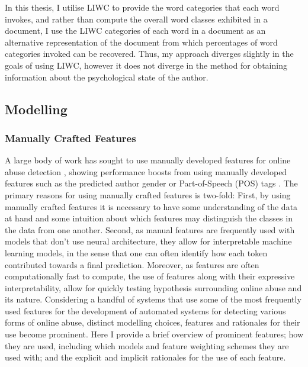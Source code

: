 In this thesis, I utilise LIWC to provide the word categories that each word invokes, and rather than compute the overall word classes exhibited in a document, I use the LIWC categories of each word in a document as an alternative representation of the document from which percentages of word categories invoked can be recovered. Thus, my approach diverges slightly in the goals of using LIWC, however it does not diverge in the method for obtaining information about the psychological state of the author.

\subsection{Modelling}
\subsubsection{Manually Crafted Features}

A large body of work has sought to use manually developed features for online abuse detection \citep{Davidson:2017,Waseem:2017,Ibrohim:2019,Vega:2019,Wiegand:2018,Tian:2020,Kumar:2019,Fortuna:2018}, showing performance boosts from using manually developed features such as the predicted author gender \citep{Waseem-Hovy:2016} or Part-of-Speech (POS) tags \citep{Davidson:2017}. The primary reasons for using manually crafted features is two-fold: First, by using manually crafted features it is necessary to have some understanding of the data at hand and some intuition about which features may distinguish the classes in the data from one another. Second, as manual features are frequently used with models that don't use neural architecture, they allow for interpretable machine learning models, in the sense that one can often identify how each token contributed towards a final prediction. Moreover, as features are often computationally fast to compute, the use of features along with their expressive interpretability, allow for quickly testing hypothesis surrounding online abuse and its nature.
Considering a handful of systems that use some of the most frequently used features for the development of automated systems for detecting various forms of online abuse, distinct modelling choices, features and rationales for their use become prominent. Here I provide a brief overview of prominent features; how they are used, including which models and feature weighting schemes they are used with; and the explicit and implicit rationales for the use of each feature.

